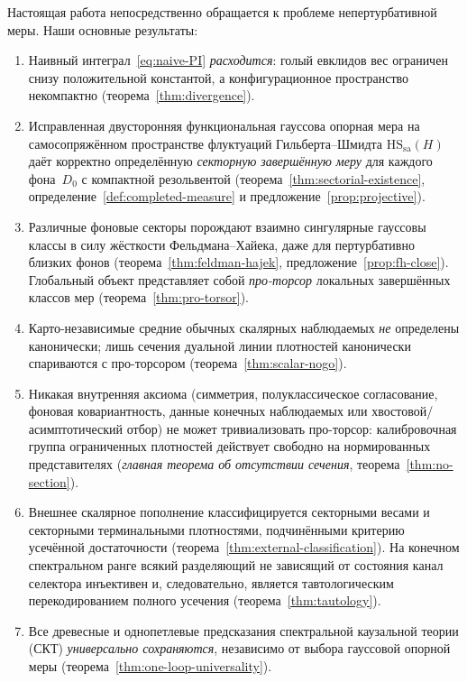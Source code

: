 \documentclass[12pt,a4paper]{article}
\theoremstyle{plain}
\theoremstyle{definition}
\theoremstyle{remark}
\newcommand{\HS}{\mathrm{HS}}
\newcommand{\sa}{\mathrm{sa}}
\begin{document}
Настоящая работа непосредственно обращается к проблеме
непертурбативной меры.  Наши основные результаты:
\begin{enumerate}[leftmargin=2em]
  \item Наивный интеграл~\eqref{eq:naive-PI} \emph{расходится}:
    голый евклидов вес ограничен снизу положительной константой, а
    конфигурационное пространство некомпактно
    (теорема~\ref{thm:divergence}).

  \item Исправленная двусторонняя функциональная гауссова опорная
    мера на самосопряжённом пространстве флуктуаций
    Гильберта--Шмидта $\HS_\sa(H)$ даёт корректно определённую
    \emph{секторную завершённую меру} для каждого фона~$D_0$ с
    компактной резольвентой
    (теорема~\ref{thm:sectorial-existence},
    определение~\ref{def:completed-measure}
    и предложение~\ref{prop:projective}).

  \item Различные фоновые секторы порождают взаимно сингулярные
    гауссовы классы в силу жёсткости Фельдмана--Хайека, даже для
    пертурбативно близких фонов
    (теорема~\ref{thm:feldman-hajek},
    предложение~\ref{prop:fh-close}).  Глобальный объект
    представляет собой \emph{про-торсор} локальных завершённых
    классов мер (теорема~\ref{thm:pro-torsor}).

  \item Карто-независимые средние обычных скалярных наблюдаемых
    \emph{не} определены канонически; лишь сечения дуальной линии
    плотностей канонически спариваются с про-торсором
    (теорема~\ref{thm:scalar-nogo}).

  \item Никакая внутренняя аксиома (симметрия, полуклассическое
    согласование, фоновая ковариантность, данные конечных
    наблюдаемых или хвостовой/асимптотический отбор) не может
    тривиализовать про-торсор: калибровочная группа ограниченных
    плотностей действует свободно на нормированных представителях
    (\emph{главная теорема об отсутствии сечения},
    теорема~\ref{thm:no-section}).

  \item Внешнее скалярное пополнение классифицируется секторными
    весами и секторными терминальными плотностями, подчинёнными
    критерию усечённой достаточности
    (теорема~\ref{thm:external-classification}).
    На конечном спектральном ранге всякий разделяющий
    не зависящий от состояния канал селектора инъективен и, следовательно,
    является тавтологическим перекодированием полного усечения
    (теорема~\ref{thm:tautology}).

  \item Все древесные и однопетлевые предсказания спектральной
    каузальной теории (СКТ) \emph{универсально сохраняются}, независимо
    от выбора гауссовой опорной меры
    (теорема~\ref{thm:one-loop-universality}).
\end{enumerate}
\end{document}

